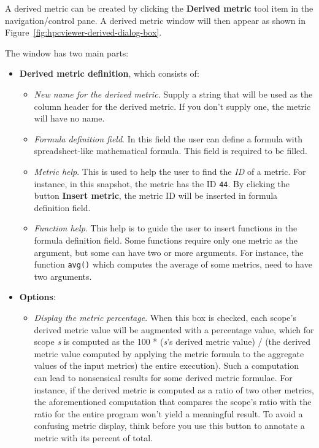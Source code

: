 A derived metric can be created by clicking the \textbf{Derived metric} tool item in the navigation/control pane.
A derived metric window will then appear as shown in Figure~\ref{fig:hpcviewer-derived-dialog-box}.


The window has two main parts:
\begin{itemize}

\item \textbf{Derived metric definition}, which consists of:

\begin{itemize}

\item \textit{New name for the derived metric}.
  Supply a string that will be used as the column header for the derived metric.
  If you don't supply one, the metric will have no name.

\item \textit{Formula definition field}.
  In this field the user can define a formula with spreadsheet-like mathematical formula.
  This field is required to be filled.

\item \textit{Metric help}.
  This is used to help the user to find the \textit{ID} of a metric.
  For instance, in this snapshot, the metric  has the ID \texttt{44}.
  By clicking the button \textbf{Insert metric}, the metric ID will be inserted in formula definition field.

\item \textit{Function help}.
  This help is to guide the user to insert functions in the formula definition field.
  Some functions require only one metric as the argument, but some can have two or more arguments.
  For instance, the function \texttt{avg()} which computes the average of some metrics, need to have two arguments.
\end{itemize}

\item \textbf{Options}:
\begin{itemize}

\item \textit{Display the metric percentage}.
  When this box is checked, each scope's derived metric value will be augmented with a percentage value, which for scope \textit{s} is computed as the 100 * (\textit{s}'s derived metric value) / (the derived metric value computed by applying the metric formula to the aggregate values of the input metrics) the entire execution).
  Such a computation can lead to nonsensical results for some derived metric formulae.
  For instance, if the derived metric is computed as a ratio of two other metrics, the aforementioned computation that compares the scope's ratio with the ratio for the entire program won't yield a meaningful result.
  To avoid a confusing metric display, think before you use this button to annotate a metric with its percent of total.
\end{itemize}

\end{itemize}

